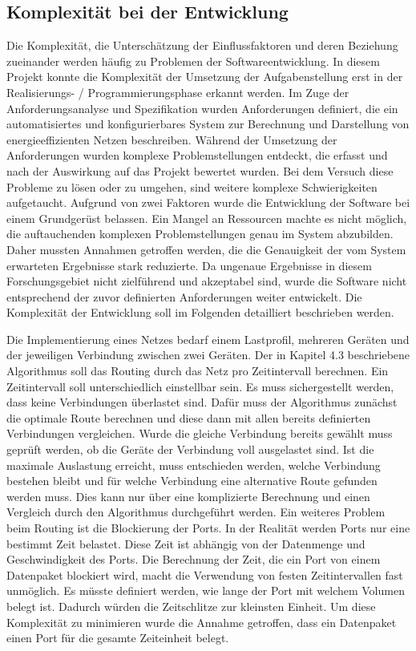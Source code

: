 \documentclass[12pt,titlepage]{article}
\begin{document}
\subsection{Komplexität bei der Entwicklung}
Die Komplexität, die Unterschätzung der Einflussfaktoren und deren Beziehung zueinander werden häufig zu Problemen der Softwareentwicklung. In diesem Projekt konnte die Komplexität der Umsetzung der Aufgabenstellung erst in der Realisierungs- / Programmierungsphase erkannt werden. Im Zuge der Anforderungsanalyse und Spezifikation wurden Anforderungen definiert, die ein automatisiertes und konfigurierbares System zur Berechnung und Darstellung von energieeffizienten Netzen beschreiben. Während der Umsetzung der Anforderungen wurden komplexe Problemstellungen entdeckt, die erfasst und nach der Auswirkung auf das Projekt bewertet wurden. Bei dem Versuch diese Probleme zu lösen oder zu umgehen, sind weitere komplexe Schwierigkeiten aufgetaucht. Aufgrund von zwei Faktoren wurde die Entwicklung der Software bei einem Grundgerüst belassen. Ein Mangel an Ressourcen machte es nicht möglich, die auftauchenden komplexen Problemstellungen genau im System abzubilden. Daher mussten Annahmen getroffen werden, die die Genauigkeit der vom System erwarteten Ergebnisse stark reduzierte. Da ungenaue Ergebnisse in diesem Forschungsgebiet nicht zielführend und akzeptabel sind, wurde die Software nicht entsprechend der zuvor definierten Anforderungen weiter entwickelt. Die Komplexität der Entwicklung soll im Folgenden detailliert beschrieben werden.  


Die Implementierung eines Netzes bedarf einem Lastprofil, mehreren Geräten und der jeweiligen Verbindung zwischen zwei Geräten. Der in Kapitel 4.3 beschriebene Algorithmus soll das Routing durch das Netz pro Zeitintervall berechnen. Ein Zeitintervall soll unterschiedlich einstellbar sein. Es muss sichergestellt werden, dass keine Verbindungen überlastet sind. Dafür muss der Algorithmus zunächst die optimale Route berechnen und diese dann mit allen bereits definierten Verbindungen vergleichen. Wurde die gleiche Verbindung bereits gewählt muss geprüft werden, ob die Geräte der Verbindung voll ausgelastet sind. Ist die maximale Auslastung erreicht, muss entschieden werden, welche Verbindung bestehen bleibt und für welche Verbindung eine alternative Route gefunden werden muss. Dies kann nur über eine komplizierte Berechnung und einen Vergleich durch den Algorithmus durchgeführt werden. Ein weiteres Problem beim Routing ist die Blockierung der Ports. In der Realität werden Ports nur eine bestimmt Zeit belastet. Diese Zeit ist abhängig von der Datenmenge und Geschwindigkeit des Ports. Die Berechnung der Zeit, die ein Port von einem Datenpaket blockiert wird, macht  die Verwendung von festen Zeitintervallen fast unmöglich. Es müsste  definiert werden, wie lange der Port mit welchem Volumen belegt ist. Dadurch würden die Zeitschlitze zur kleinsten Einheit. Um diese Komplexität zu minimieren wurde die Annahme getroffen, dass ein Datenpaket einen Port für die gesamte Zeiteinheit belegt. 
\end{document}
